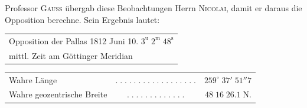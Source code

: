 \smallskip

\par\indent Professor \textsc{Gauss} übergab diese Beobachtungen Herrn \textsc{Nicolai}, damit er daraus die Opposition berechne. Sein Ergebnis lautet:
\par\smallskip\noindent{}\begin{minipage}{\linewidth}\centering
\fontsize{10}{12}\selectfont\setlength{\tabcolsep}{0pt}\renewcommand{\arraystretch}{1.15}\begin{tabular}{l}
Opposition der Pallas 1812 Juni 10. $3^{\mathrm u}\;2^{\mathrm m}\;48^{\mathrm s}$\\mittl. Zeit am Göttinger Meridian
\end{tabular}\par\smallskip
\fontsize{10}{12}\selectfont\setlength{\tabcolsep}{2pt}\renewcommand{\arraystretch}{1.15}\begin{tabular}{lcr}
Wahre Länge & $.\;.\;.\;.\;.\;.\;.\;.\;.\;.\;.\;.\;.\;.\;.\;.\;.\;.$ & $259^\circ\;37'\;51''7$\\
Wahre geozentrische Breite & $.\;.\;.\;.\;.\;.\;.\;.\;.\;.\;.\;.\;.$ & $48\;16\;26.1\;\mathrm{N}.$\\
\end{tabular}\par\end{minipage}\par

